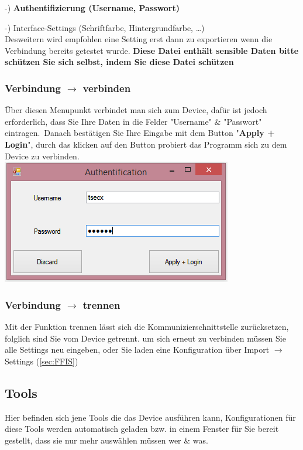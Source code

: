 \documentclass[11pt]{article} %
\begin{document}
-) \textbf{Authentifizierung (Username, Passwort)}

-) Interface-Settings (Schriftfarbe, Hintergrundfarbe, \dots )\\
Desweitern wird empfohlen eine Setting erst dann zu exportieren wenn die Verbindung bereits getestet wurde.
\textbf{Diese Datei enthält sensible Daten bitte schützen Sie sich selbst, indem Sie diese Datei schützen}\\
\subsubsection{Verbindung $\rightarrow$ verbinden}
Über diesen Menupunkt verbindet man sich zum Device, dafür ist jedoch erforderlich, dass Sie Ihre Daten in die Felder "Username" \& "Passwort" eintragen.\
Danach bestätigen Sie Ihre Eingabe mit dem Button "\textbf{Apply + Login}", durch das klicken auf den Button probiert das Programm sich zu dem Device zu verbinden.\\
\includegraphics{VERBINDEN}
\subsubsection{Verbindung $\rightarrow$ trennen}
Mit der Funktion trennen lässt sich die Kommunizierschnittstelle zurücksetzen, folglich sind Sie vom Device getrennt. um sich erneut zu verbinden müssen Sie alle Settings neu eingeben, oder Sie laden eine Konfiguration über Import $\rightarrow$ Settings (\ref{sec:FFIS}) \\
\pagebreak
\subsection{Tools}
Hier befinden sich jene Tools die das Device ausführen kann, Konfigurationen für diese Tools werden automatisch geladen bzw. in einem Fenster für Sie bereit gestellt, dass sie nur mehr auswählen müssen wer \& was.\\
\end{document}
